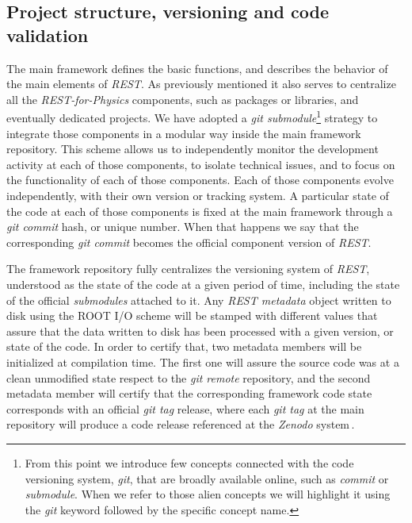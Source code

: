 \subsection{Project structure, versioning and code validation}

The main framework defines the basic functions, and describes the behavior of the main elements of \emph{REST}. As previously mentioned it also serves to centralize all the \emph{REST-for-Physics} components, such as packages or libraries, and eventually dedicated projects. We have adopted a \emph{git submodule}\footnote{From this point we introduce few concepts connected with the code versioning system, \emph{git}, that are broadly available online, such as \emph{commit} or \emph{submodule}. When we refer to those alien concepts we will highlight it using the \emph{git} keyword followed by the specific concept name.} strategy to integrate those components in a modular way inside the main framework repository. This scheme allows us to independently monitor the development activity at each of those components, to isolate technical issues, and to focus on the functionality of each of those components. Each of those components evolve independently, with their own version or tracking system. A particular state of the code at each of those components is fixed at the main framework through a \emph{git commit} hash, or unique number. When that happens we say that the corresponding \emph{git commit} becomes the official component version of \emph{REST}.

The framework repository fully centralizes the versioning system of \emph{REST}, understood as the state of the code at a given period of time, including the state of the official \emph{submodules} attached to it. Any \emph{REST metadata} object written to disk using the ROOT I/O scheme will be stamped with different values that assure that the data written to disk has been processed with a given version, or state of the code. In order to certify that, two metadata members will be initialized at compilation time. The first one will assure the source code was at a clean unmodified state respect to the \emph{git remote} repository, and the second metadata member will certify that the corresponding framework code state corresponds with an official \emph{git tag} release, where each \emph{git tag} at the main repository will produce a code release referenced at the \emph{Zenodo} system\,\cite{javier_galan_2021_4692983}.


